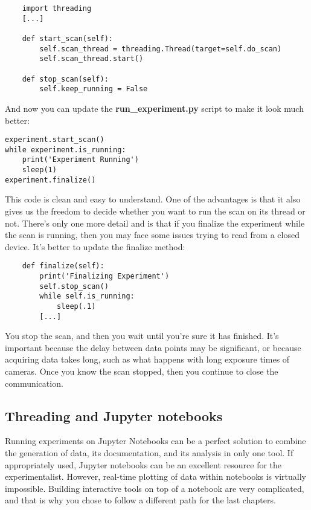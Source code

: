\begin{verbatim}
    import threading
    [...]

    def start_scan(self):
        self.scan_thread = threading.Thread(target=self.do_scan)
        self.scan_thread.start()

    def stop_scan(self):
        self.keep_running = False
\end{verbatim}

And now you can update the \textbf{run\_experiment.py} script to make it look much better:

\begin{verbatim}
experiment.start_scan()
while experiment.is_running:
    print('Experiment Running')
    sleep(1)
experiment.finalize()
\end{verbatim}

This code is clean and easy to understand. One of the advantages is that it also gives us the freedom to decide whether you want to run the scan on its thread or not. There's only one more detail and is that if you finalize the experiment while the scan is running, then you may face some issues trying to read from a closed device. It's better to update the finalize method:

\begin{verbatim}
    def finalize(self):
        print('Finalizing Experiment')
        self.stop_scan()
        while self.is_running:
            sleep(.1)
        [...]
\end{verbatim}

You stop the scan, and then you wait until you're sure it has finished. It's important because the delay between data points may be significant, or because acquiring data takes long, such as what happens with long exposure times of cameras. Once you know the scan stopped, then you continue to close the communication.

\subsection{Threading and Jupyter notebooks}\label{subsec:jupyter}
Running experiments on Jupyter Notebooks can be a perfect solution to combine the generation of data, its documentation, and its analysis in only one tool. If appropriately used, Jupyter notebooks can be an excellent resource for the experimentalist. However, real-time plotting of data within notebooks is virtually impossible. Building interactive tools on top of a notebook are very complicated, and that is why you chose to follow a different path for the last chapters.

